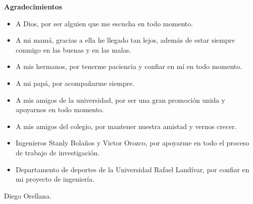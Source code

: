 \afterpage{\blankpage}
\newpage
{\LARGE \textbf{Agradecimientos}}\\[2cm]
\begin{itemize}
\item A Dios, por ser alguien que me escucha en todo momento.
\item A mi mam\'a, gracias a ella he llegado tan lejos, adem\'as de estar siempre conmigo en las buenas y en las malas. 
\item A mis hermanos, por tenerme paciencia y confiar en m\'i en todo momento.
\item A mi pap\'a, por acompa\~narme siempre.
\item A mis amigos de la universidad, por ser una gran promoci\'on unida y apoyarnos en todo momento.
\item A mis amigos del colegio, por mantener nuestra amistad y vernos crecer.
\item Ingenieros Stanly Bola\~nos y Victor Orozco, por apoyarme en todo el proceso de trabajo de investigaci\'on.
\item Departamento de deportes de la Universidad Rafael Land\'ivar, por confiar en mi proyecto de ingenier\'ia.
\end{itemize}
\begin{center}
Diego Orellana.
\end{center}